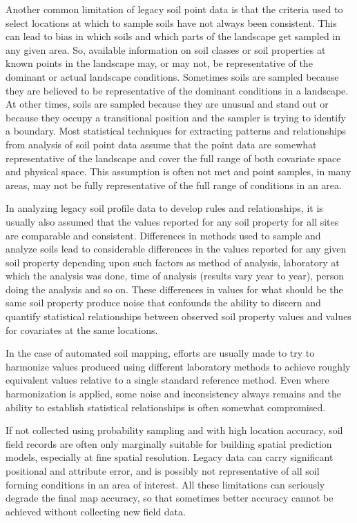 \documentclass[11pt]{krantz}
\makeatletter
\newenvironment{kframe}{%
\medskip{}
\setlength{\fboxsep}{.8em}
 \def\at@end@of@kframe{}%
 \ifinner\ifhmode%
  \def\at@end@of@kframe{\end{minipage}}%
  \begin{minipage}{\columnwidth}%
 \fi\fi%
 \def\FrameCommand##1{\hskip\@totalleftmargin \hskip-\fboxsep
 \colorbox{shadecolor}{##1}\hskip-\fboxsep
     \hskip-\linewidth \hskip-\@totalleftmargin \hskip\columnwidth}%
 \MakeFramed {\advance\hsize-\width
   \@totalleftmargin\z@ \linewidth\hsize
   \@setminipage}}%
 {\par\unskip\endMakeFramed%
 \at@end@of@kframe}
\newenvironment{rmdblock}[1]
  {
  \begin{itemize}
  \renewcommand{\labelitemi}{
    \raisebox{-.7\height}[0pt][0pt]{
      {\setkeys{Gin}{width=3em,keepaspectratio}\texttt{[image: images/\#1]}}
    }
  }
  \setlength{\fboxsep}{1em}
  \begin{kframe}
  \item
  }
  {
  \end{kframe}
  \end{itemize}
  }
\newenvironment{rmdnote}
  {\begin{rmdblock}{note}}
  {\end{rmdblock}}
\theoremstyle{definition}
\theoremstyle{definition}
\theoremstyle{definition}
\theoremstyle{remark}
\makeatother
\begin{document}
Another common limitation of legacy soil point data is that the criteria
used to select locations at which to sample soils have not always been
consistent. This can lead to bias in which soils and which parts of the
landscape get sampled in any given area. So, available information on
soil classes or soil properties at known points in the landscape may, or
may not, be representative of the dominant or actual landscape
conditions. Sometimes soils are sampled because they are believed to be
representative of the dominant conditions in a landscape. At other
times, soils are sampled because they are unusual and stand out or
because they occupy a transitional position and the sampler is trying to
identify a boundary. Most statistical techniques for extracting patterns
and relationships from analysis of soil point data assume that the point
data are somewhat representative of the landscape and cover the full
range of both covariate space and physical space. This assumption is
often not met and point samples, in many areas, may not be fully
representative of the full range of conditions in an area.

In analyzing legacy soil profile data to develop rules and
relationships, it is usually also assumed that the values reported for
any soil property for all sites are comparable and consistent.
Differences in methods used to sample and analyze soils lead to
considerable differences in the values reported for any given soil
property depending upon such factors as method of analysis, laboratory
at which the analysis was done, time of analysis (results vary year to
year), person doing the analysis and so on. These differences in values
for what should be the same soil property produce noise that confounds
the ability to discern and quantify statistical relationships between
observed soil property values and values for covariates at the same
locations.

In the case of automated soil mapping, efforts are usually made to try
to harmonize values produced using different laboratory methods to
achieve roughly equivalent values relative to a single standard
reference method. Even where harmonization is applied, some noise and
inconsistency always remains and the ability to establish statistical
relationships is often somewhat compromised.

\begin{rmdnote}
If not collected using probability sampling and with high location
accuracy, soil field records are often only marginally suitable for
building spatial prediction models, especially at fine spatial
resolution. Legacy data can carry significant positional and attribute
error, and is possibly not representative of all soil forming conditions
in an area of interest. All these limitations can seriously degrade the
final map accuracy, so that sometimes better accuracy cannot be achieved
without collecting new field data.
\end{rmdnote}
\end{document}
